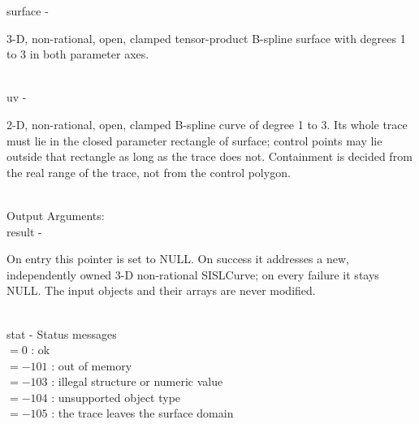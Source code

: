         \>\>    {\fov surface}\> - \>      \begin{minipg2}
                                3-D, non-rational, open, clamped
                                tensor-product B-spline surface with
                                degrees 1 to 3 in both parameter axes.
                                \end{minipg2}\\[0.3ex]
        \>\>    {\fov uv}\> - \>   \begin{minipg2}
                                2-D, non-rational, open, clamped
                                B-spline curve of degree 1 to 3.
                                Its whole trace must lie in the closed
                                parameter rectangle of {\fov surface};
                                control points may lie outside that
                                rectangle as long as the trace does
                                not.  Containment is decided from the
                                real range of the trace, not from the
                                control polygon.
                                \end{minipg2}\\
        \>Output Arguments:\\
        \>\>    {\fov result}\> - \> \begin{minipg2}
                                On entry this pointer is set to NULL.
                                On success it addresses a new,
                                independently owned 3-D non-rational
                                SISLCurve; on every failure it stays
                                NULL.  The input objects and their
                                arrays are never modified.
                                \end{minipg2}\\
        \>\>    {\fov stat}     \> - \> Status messages\\
                \>\>\>\>\>              $= 0$   : ok\\
                \>\>\>\>\>              $= -101$ : out of memory\\
                \>\>\>\>\>              $= -103$ : illegal structure or numeric value\\
                \>\>\>\>\>              $= -104$ : unsupported object type\\
                \>\>\>\>\>              $= -105$ : the trace leaves the surface domain\\
